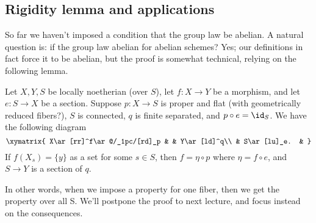 \subsection{Rigidity lemma and applications} %

So far we haven't imposed a condition that the group law be abelian. A natural question is: if the group law abelian for abelian schemes? Yes; our definitions in fact force it to be abelian, but the proof is somewhat technical, relying on the following lemma.
\begin{lem}
Let $X,Y,S$ be locally noetherian (over $S$), let $f:X\to Y$ be a morphism, and let $e:S\to X$ be a section. Suppose $p:X\to S$ is proper and flat (with geometrically reduced fibers?), $S$ is connected, $q$ is finite separated, and $p\circ e=\id_S$. We have the following diagram
\[
\xymatrix{
X\ar[rr]^f\ar@/_1pc/[rd]_p & & Y\ar[ld]^q\\
& S\ar[lu]_e. & 
}
\]
If $f(X_s)=\{y\}$ as a set for some $s\in S$, then $f=\eta \circ p$ where $\eta=f\circ e$, and $S\to Y$ is a section of $q$.
\end{lem}
In other words, when we impose a property for one fiber, then we get the property over all S. We'll postpone the proof to next lecture, and focus instead on the consequences.\\


